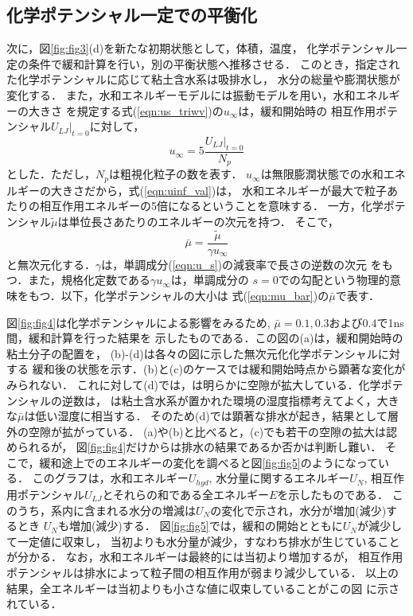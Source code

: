 \subsection{化学ポテンシャル一定での平衡化}
次に，図\ref{fig:fig3}(d)を新たな初期状態として，体積，温度，
化学ポテンシャル一定の条件で緩和計算を行い，別の平衡状態へ推移させる．
このとき，指定された化学ポテンシャルに応じて粘土含水系は吸排水し，
水分の総量や膨潤状態が変化する．
また，水和エネルギーモデルには振動モデルを用い，水和エネルギーの大きさ
を規定する式(\ref{eqn:us_triwv})の$u_{\infty}$は，緩和開始時の
相互作用ポテンシャル$\left. U_{LJ}\right|_{t=0}$に対して，
\begin{equation}
	u_{\infty}=5\frac{\left.U_{LJ}\right|_{t=0}}{N_p}
	\label{eqn:uinf_val}
\end{equation}
とした．ただし，$N_p$は粗視化粒子の数を表す．
$u_{\infty}$は無限膨潤状態での水和エネルギーの大きさだから，式(\ref{eqn:uinf_val})は，
水和エネルギーが最大で粒子あたりの相互作用エネルギーの5倍になるということを意味する．
一方，化学ポテンシャル$\tilde \mu$は単位長さあたりのエネルギーの次元を持つ．
そこで，
\begin{equation}
	\bar \mu = \frac{\tilde \mu }{\gamma u_{\infty}}
	\label{eqn:mu_bar}
\end{equation}
と無次元化する．$\gamma$は，単調成分(\ref{eqn:u_s})の減衰率で長さの逆数の次元
をもつ．また，規格化定数である$\gamma u_\infty$は，単調成分の
$s=0$での勾配という物理的意味をもつ．以下，化学ポテンシャルの大小は
式(\ref{eqn:mu_bar})の$\bar \mu$で表す．

図\ref{fig:fig4}は化学ポテンシャルによる影響をみるため,
$\bar{\mu}=0.1, 0.3$および$0.4$で1ns間，緩和計算を行った結果を
示したものである．この図の(a)は，緩和開始時の粘土分子の配置を，
(b)-(d)は各々の図に示した無次元化化学ポテンシャルに対する
緩和後の状態を示す．(b)と(c)のケースでは緩和開始時点から顕著な変化がみられない．
これに対して(d)では，は明らかに空隙が拡大している．化学ポテンシャルの逆数は，
は粘土含水系が置かれた環境の湿度指標考えてよく，大きな$\bar{\mu}$は低い湿度に相当する．
そのため(d)では顕著な排水が起き，結果として層外の空隙が拡がっている．
(a)や(b)と比べると，(c)でも若干の空隙の拡大は認められるが，
図\ref{fig:fig4}だけからは排水の結果であるか否かは判断し難い．
そこで，緩和途上でのエネルギーの変化を調べると図\ref{fig:fig5}のようになっている．
このグラフは，水和エネルギー$U_{hyd}$, 水分量に関するエネルギー$U_{N}$,
相互作用ポテンシャル$U_{LJ}$とそれらの和である全エネルギー$E$を示したものである．
このうち，系内に含まれる水分の増減は$U_{N}$の変化で示され，水分が増加(減少)するとき
$U_N$も増加(減少)する．
図\ref{fig:fig5}では，緩和の開始とともに$U_{N}$が減少して一定値に収束し，
当初よりも水分量が減少，すなわち排水が生じていることが分かる．
なお，水和エネルギーは最終的には当初より増加するが，
相互作用ポテンシャルは排水によって粒子間の相互作用が弱まり減少している．
以上の結果，全エネルギーは当初よりも小さな値に収束していることがこの図
に示されている．

